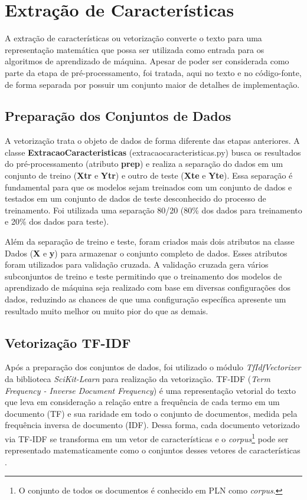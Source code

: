 \section{Extração de Características}

A extração de características ou vetorização converte o texto para uma representação matemática que possa ser utilizada como entrada para os algoritmos de aprendizado de máquina. Apesar de poder ser considerada como parte da etapa de pré-processamento, foi tratada, aqui no texto e no código-fonte, de forma separada por possuir um conjunto maior de detalhes de implementação.

\subsection{Preparação dos Conjuntos de Dados}

A vetorização trata o objeto de dados de forma diferente das etapas anteriores. A classe \textbf{ExtracaoCaracteristicas} (extracao\textunderscore caracteristicas.py) busca os resultados do pré-processamento (atributo \textbf{prep}) e realiza a separação do dados em um conjunto de treino (\textbf{Xtr} e \textbf{Ytr}) e outro de teste (\textbf{Xte} e \textbf{Yte}). Essa separação é fundamental para que os modelos sejam treinados com um conjunto de dados e testados em um conjunto de dados de teste desconhecido do processo de treinamento. Foi utilizada uma separação 80/20 (80\% dos dados para treinamento e 20\% dos dados para teste). 

Além da separação de treino e teste, foram criados mais dois atributos na classe Dados (\textbf{X} e \textbf{y}) para armazenar o conjunto completo de dados. Esses atributos foram utilizados para validação cruzada. A validação cruzada gera vários subconjuntos de treino e teste permitindo que o treinamento dos modelos de aprendizado de máquina seja realizado com base em diversas configurações dos dados, reduzindo as chances de que uma configuração específica apresente um resultado muito melhor ou muito pior do que as demais.  

\subsection{Vetorização TF-IDF}

Após a preparação dos conjuntos de dados, foi utilizado o módulo \textit{TfIdfVectorizer} da biblioteca \textit{SciKit-Learn} para realização da vetorização. TF-IDF (\textit{Term Frequency - Inverse Document Frequency}) é uma representação vetorial do texto que leva em consideração a relação entre a frequência de cada termo em um documento (TF) e sua raridade em todo o conjunto de documentos, medida pela frequência inversa de documento (IDF). Dessa forma, cada documento vetorizado via TF-IDF se transforma em um vetor de características e o   \textit{corpus}\footnote{O conjunto de todos os documentos é conhecido em PLN como \textit{corpus}.} pode ser representado matematicamente como o conjuntos desses vetores de características \cite{DSNegocios2016}.

 